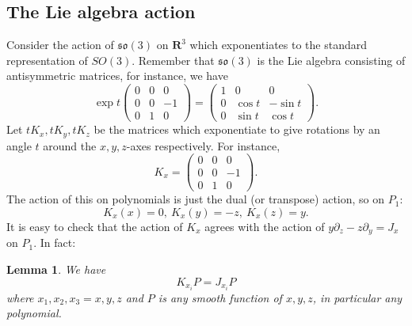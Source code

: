 \documentclass[12pt]{article}
\newcommand{\RR}{\mathbf{R}}
\newtheorem{lma}[thm]{Lemma}
\theoremstyle{definition}
\theoremstyle{check}
\theoremstyle{remark}
\theoremstyle{TheoremNum}
\begin{document}
\subsection{The Lie algebra action}

Consider the action of $\mathfrak{so}(3)$ on $\RR^3$ which exponentiates to the standard representation of $SO(3)$. Remember that $\mathfrak{so}(3)$ is the Lie algebra consisting of antisymmetric matrices, for instance, we have
\[\exp t\left(\begin{array}{ccc}
0 & 0 & 0\\
0 & 0 & -1\\
0 & 1 & 0
\end{array}\right)=\left(\begin{array}{ccc}
1 & 0 & 0\\
0 & \cos t & -\sin t\\
0 & \sin t & \cos t
\end{array}\right).\]
Let $tK_x,tK_y,tK_z$ be the matrices which exponentiate to give rotations by an angle $t$ around the $x,y,z$-axes respectively. For instance,
\[K_x=\left(\begin{array}{ccc}
0 & 0 & 0\\
0 & 0 & -1\\
0 & 1 & 0
\end{array}\right).\]
The action of this on polynomials is just the dual (or transpose) action, so on $P_1$:
\[K_x(x)=0,\ K_x(y)=-z,\ K_x(z)=y.\]
It is easy to check that the action of $K_x$ agrees with the action of $y\partial_z-z\partial_y=J_x$ on $P_1$. In fact:
\begin{lma}
We have
\[K_{x_i}P=J_{x_i}P\]
where $x_1,x_2,x_3=x,y,z$ and $P$ is any smooth function of $x,y,z$, in particular any polynomial.
\end{lma}
\end{document}
